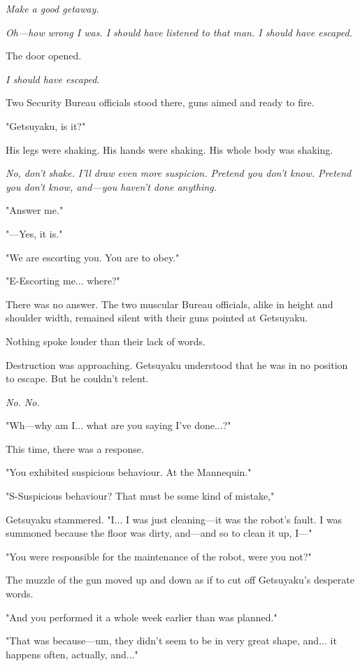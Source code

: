 \emph{Make a good getaway.}

\emph{Oh---how wrong I was. I should have listened to that man. I should have
escaped.}

The door opened.

\emph{I should have escaped.}

Two Security Bureau officials stood there, guns aimed and ready to fire.

"Getsuyaku, is it?"

His legs were shaking. His hands were shaking. His whole body was
shaking.

\emph{No, don't shake. I'll draw even more suspicion. Pretend you don't know.
Pretend you don't know, and---you haven't done anything.}

"Answer me."

"---Yes, it is."

"We are escorting you. You are to obey."

\mybreak

"E-Escorting me... where?"

There was no answer. The two muscular Bureau officials, alike in height
and shoulder width, remained silent with their guns pointed at
Getsuyaku.

Nothing spoke louder than their lack of words.

Destruction was approaching. Getsuyaku understood that he was in no
position to escape. But he couldn't relent.

\emph{No. No.}

"Wh---why am I... what are you saying I've done...?"~

This time, there was a response.

"You exhibited suspicious behaviour. At the Mannequin."

"S-Suspicious behaviour? That must be some kind of mistake,"~

Getsuyaku stammered. "I... I was just cleaning---it was the robot's fault.
I was summoned because the floor was dirty, and---and so to clean it up,
I---"

"You were responsible for the maintenance of the robot, were you not?"

The muzzle of the gun moved up and down as if to cut off Getsuyaku's
desperate words.

"And you performed it a whole week earlier than was planned."

"That was because---um, they didn't seem to be in very great shape, and...
it happens often, actually, and..."

